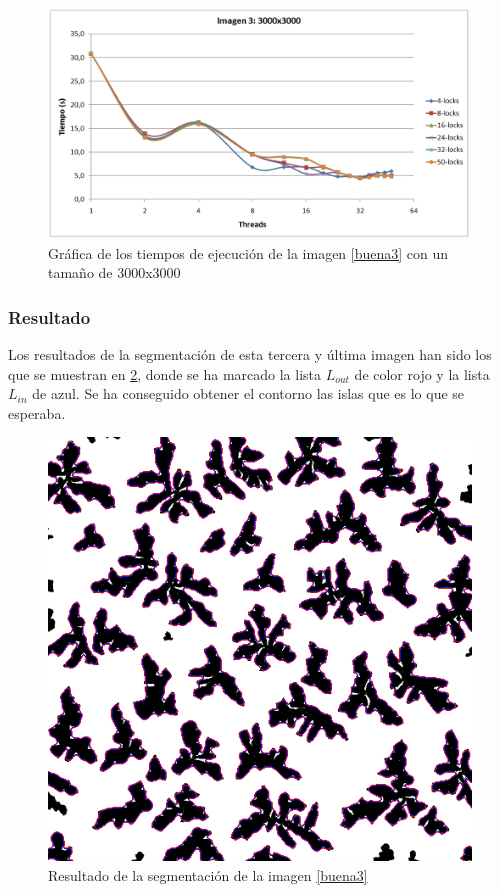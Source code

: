 \begin{figure}[H]
	\captionsetup{justification=centering}
	\centering
	\includegraphics[width=.8\textwidth]{./imagenes/graf3-3000}
	\caption{Gr\'{a}fica de los tiempos de ejecuci\'{o}n de la imagen \ref{buena3} con un tama\~{n}o de 3000x3000}	
	\label{graf3-3000}
\end{figure}

\subsubsection{Resultado}

Los resultados de la segmentaci\'{o}n de esta tercera y \'{u}ltima imagen han sido los que se muestran en \ref{result3}, donde se ha marcado la lista $L_{out}$ de color rojo y la lista $L_{in}$ de azul. Se ha conseguido obtener el contorno las islas que es lo que se esperaba.


\begin{figure}[H]
	\captionsetup{justification=centering}
	\centering
	\includegraphics[width=.7\textwidth]{./imagenes/result3}
	\caption{Resultado de la segmentaci\'{o}n de la imagen \ref{buena3}}	
	\label{result3}
\end{figure}


